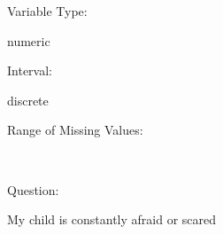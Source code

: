 \documentclass[
]{article}
\begin{document}
\begin{minipage}[t]{0.3\linewidth}

Variable Type:

\end{minipage}%
\begin{minipage}[t]{0.7\linewidth}

numeric

\end{minipage}

\begin{minipage}[t]{0.3\linewidth}

Interval:

\end{minipage}%
\begin{minipage}[t]{0.7\linewidth}

discrete

\end{minipage}

\begin{minipage}[t]{0.3\linewidth}

Range of Missing Values:

\end{minipage}%
\begin{minipage}[t]{0.7\linewidth}

~

\end{minipage}

\begin{minipage}[t]{0.3\linewidth}

Question:

\end{minipage}%
\begin{minipage}[t]{0.7\linewidth}

My child is constantly afraid or scared

\end{minipage}
\end{document}
